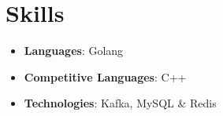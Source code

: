 \documentclass[letterpaper,11pt]{article}
\newcommand{\resumeItem}[2]{
  \item\small{
    \textbf{#1}{: #2 \vspace{-2pt}}
  }
}
\newcommand{\resumeSubItem}[2]{\resumeItem{#1}{#2}\vspace{-4pt}}
\newcommand{\resumeSubHeadingListStart}{\begin{itemize}[leftmargin=*]}
\newcommand{\resumeSubHeadingListEnd}{\end{itemize}}
\begin{document}

%
\section{Skills}
 \resumeSubHeadingListStart
    \resumeSubItem{Languages}{Golang}
    \resumeSubItem{Competitive Languages}{C++}
    \resumeSubItem{Technologies}{Kafka, MySQL \& Redis}
 \resumeSubHeadingListEnd


\end{document}

